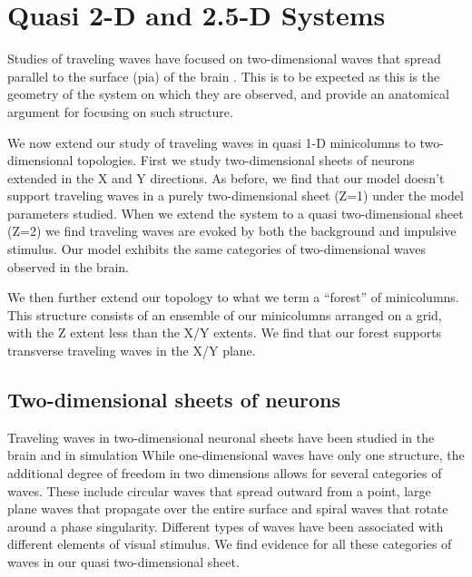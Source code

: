 
\chapter{Quasi 2-D and 2.5-D Systems}
Studies of traveling waves have focused on two-dimensional waves that spread parallel to the surface (pia) of the brain \citep{reimer2010}\citep{keane2015}\citep{Townsend2018}\citep{Golomb1997}\citep{Qi2015}. 
This is to be expected as this is the geometry of the system on which they are observed, and \citet{Wilson1973} provide an anatomical argument for focusing on such structure. 

We now extend our study of traveling waves in quasi 1-D minicolumns to two-dimensional topologies.
First we study two-dimensional sheets of neurons extended in the X and Y directions.
As before, we find that our model doesn't support traveling waves in a purely two-dimensional sheet (Z=1) under the model parameters studied.
When we extend the system to a quasi two-dimensional sheet (Z=2) we find traveling waves are evoked by both the background and impulsive stimulus.
Our model exhibits the same categories of two-dimensional waves observed in the brain.

We then further extend our topology to what we term a ``forest'' of minicolumns.
This structure consists of an ensemble of our minicolumns arranged on a grid, with the Z extent less than the X/Y extents.
We find that our forest supports transverse traveling waves in the X/Y plane.

\section{Two-dimensional sheets of neurons}
Traveling waves in two-dimensional neuronal sheets have been studied in the brain \citep{huang2004}\citep{Townsend2018} and in simulation\citep{keane2015}\citep{Spreizer2019}
While one-dimensional waves have only one structure, the additional degree of freedom in two dimensions allows for several categories of waves.
These include circular waves that spread outward from a point, large plane waves that propagate over the entire surface and spiral waves\citep{Huang2010}\citep{Gu2013} that rotate around a phase singularity.
Different types of waves have been associated with different elements of visual stimulus\citep{Benucci2007}.
We find evidence for all these categories of waves in our quasi two-dimensional sheet.

